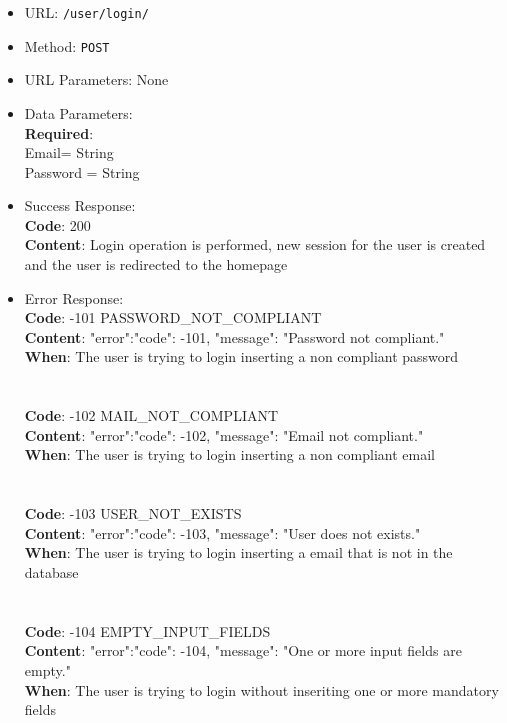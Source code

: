 \begin{itemize}
    \item URL: \texttt{/user/login/}
    \item Method: \texttt{POST}
    \item URL Parameters: None
    \item Data Parameters: \\
    \textbf{Required}:\\
    Email= {String}\\
    Password = {String}\\
    \item Success Response:\\
    \textbf{Code}: 200\\
    \textbf{Content}: Login operation is performed, new session for the user is created and the user is redirected to the homepage\\
    \item Error Response:\\
    \textbf{Code}: -101 PASSWORD\_NOT\_COMPLIANT\\
    \textbf{Content}: {"error":{"code": -101, "message": "Password not compliant."}}\\
    \textbf{When}: The user is trying to login inserting a non compliant password\\
    \\
    \\
    \textbf{Code}: -102 MAIL\_NOT\_COMPLIANT\\
    \textbf{Content}: {"error":{"code": -102, "message": "Email not compliant."}}\\
    \textbf{When}: The user is trying to login inserting a non compliant email\\
    \\
    \\
    \textbf{Code}: -103 USER\_NOT\_EXISTS\\
    \textbf{Content}: {"error":{"code": -103, "message": "User does not exists."}}\\
    \textbf{When}: The user is trying to login inserting a email that is not in the database\\
    \\
    \\
    \textbf{Code}: -104 EMPTY\_INPUT\_FIELDS\\
    \textbf{Content}: {"error":{"code": -104, "message": "One or more input fields are empty."}}\\
    \textbf{When}: The user is trying to login without inseriting one or more mandatory fields\\

\end{itemize}
